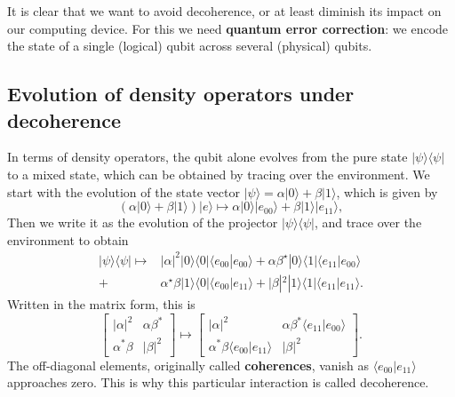 \documentclass[fleqn]{article}
\newenvironment{idea}{\noindent}{\medskip}
\begin{document}
\begin{idea}

It is clear that we want to avoid decoherence, or at least diminish its impact on our computing device.
For this we need \textbf{quantum error correction}: we encode the state of a single (logical) qubit across several (physical) qubits.

\end{idea}

\hypertarget{evolution-of-density-operators-under-decoherence}{%
\subsection{Evolution of density operators under decoherence}\label{evolution-of-density-operators-under-decoherence}}

In terms of density operators, the qubit alone evolves from the pure state \(|\psi\rangle\langle\psi|\) to a mixed state, which can be obtained by tracing over the environment.
We start with the evolution of the state vector \(|\psi\rangle=\alpha|0\rangle+\beta|1\rangle\), which is given by
\[
  \left( \alpha|0\rangle +\beta |1\rangle\right)|e\rangle \longmapsto
  \alpha |0\rangle|e_{00}\rangle +\beta |1\rangle |e_{11}\rangle,
\]
Then we write it as the evolution of the projector \(|\psi\rangle\langle\psi|\), and trace over the environment to obtain
\[
  \begin{aligned}
    |\psi\rangle\langle\psi| \longmapsto & |\alpha|^2|0\rangle\langle 0| \langle e_{00}|e_{00}\rangle+ \alpha\beta^\star |0\rangle\langle 1|\langle e_{11}|e_{00}\rangle
  \\+ &\alpha^\star\beta |1\rangle\langle 0|\langle e_{00}|e_{11}\rangle  + |\beta|^2|1\rangle\langle 1|\langle e_{11}|e_{11}\rangle.
  \end{aligned}
\]
Written in the matrix form, this is
\[
  \begin{bmatrix}
    |\alpha|^2 & \alpha\beta^\ast
  \\\alpha^\ast\beta & |\beta|^2
  \end{bmatrix}
  \longmapsto
  \begin{bmatrix}
    |\alpha|^2 & \alpha\beta^\ast \langle e_{11}|e_{00}\rangle
    \\\alpha^\ast\beta \langle e_{00}|e_{11}\rangle & |\beta|^2
  \end{bmatrix}.
\]
The off-diagonal elements, originally called \textbf{coherences}, vanish as \(\langle e_{00}|e_{11}\rangle\) approaches zero.
This is why this particular interaction is called decoherence.
\end{document}
